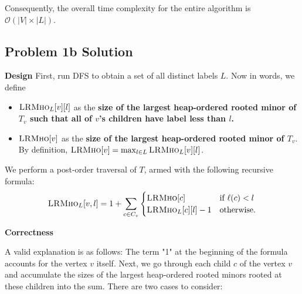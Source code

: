 \documentclass{article}
\begin{document}
    \vspace{2mm}
    Consequently, the overall time complexity for the entire algorithm is \( \mathcal{O}(|V| \times |L|) \).

\pagebreak
\subsection*{Problem 1b Solution}
    \textbf{Design}
     First, run DFS to obtain a set of all distinct labels $L$. Now in words, we define
        \begin{itemize}
            \item $\textsc{LRMho}_{L}[v][l]$ as the \textbf{size of the largest heap-ordered rooted minor of $T_{v}$ such that all of $v$'s children have label less than $l$.} 
            \item $\textsc{LRMho}[v]$ as the \textbf{size of the largest heap-ordered rooted minor of $T_{v}$}. By definition, $\textsc{LRMho}[v] = \max_{l \in L} \textsc{LRMho}_{L}[v][l]$.
        \end{itemize}
    We perform a post-order traversal of $T$, armed with the following recursive formula:
        $$\textsc{LRMho}_{L}[v, l] = 1 + \sum_{c \in C_{v}} 
        \begin{cases}
            \textsc{LRMho}[c] & \text{if $\ell(c) < l$} \\
            \textsc{LRMho}_{L}[c][l] - 1 & \text{otherwise}.
        \end{cases}$$
        
    \vspace{2mm}
    \textbf{Correctness}
    
        A valid explanation is as follows: The term "1" at the beginning of the formula accounts for the vertex \( v \) itself. Next, we go through each child \( c \) of the vertex \( v \) and accumulate the sizes of the largest heap-ordered rooted minors rooted at these children into the sum. There are two cases to consider:
        
\end{document}

